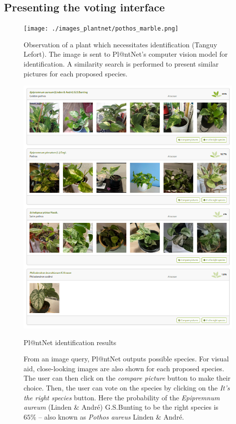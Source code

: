 \subsection{Presenting the voting interface}

\begin{figure}[tbh]
    \centering
    \begin{minipage}[b]{0.38\textwidth}
        \centering
        \texttt{[image: ./images\_plantnet/pothos\_marble.png]}
        \caption*{Observation of a plant which necessitates identification (\textcopyright Tanguy Lefort). The image is sent to Pl@ntNet's computer vision model for identification. A similarity search is performed to present similar pictures for each proposed species.}
    \end{minipage}
    \hfill
    \begin{minipage}[b]{0.55\textwidth}
        \centering
        \includegraphics[width=\textwidth]{./images_plantnet/pothos_marble_plantnet.png}
        \caption*{Pl@ntNet identification results}
    \end{minipage}
    \caption{From an image query, Pl@ntNet outputs possible species. For visual aid, close-looking images are also shown for each proposed species. The user can then click on the \emph{compare picture} button to make their choice. Then, the user can vote on the species by clicking on the \emph{It's the right species} button. Here the probability of the \emph{Epipremnum aureum} (Linden \& André) G.S.Bunting to be the right species is $65\%$ -- also known as \emph{Pothos aureus} Linden \& André.}
    \label{fig:pothos_id}
\end{figure}


